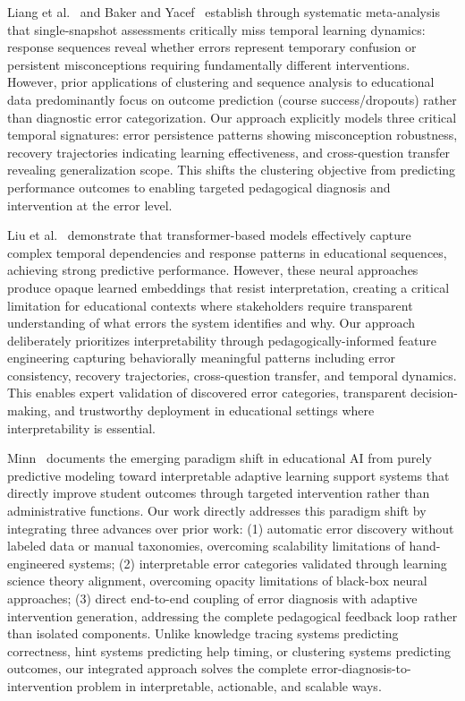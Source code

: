 \documentclass[conference]{IEEEtran}
\begin{document}
Liang et al.~\cite{liang2022} and Baker and Yacef~\cite{baker2009} establish through systematic meta-analysis that single-snapshot assessments critically miss temporal learning dynamics: response sequences reveal whether errors represent temporary confusion or persistent misconceptions requiring fundamentally different interventions. However, prior applications of clustering and sequence analysis to educational data predominantly focus on outcome prediction (course success/dropouts) rather than diagnostic error categorization. Our approach explicitly models three critical temporal signatures: error persistence patterns showing misconception robustness, recovery trajectories indicating learning effectiveness, and cross-question transfer revealing generalization scope. This shifts the clustering objective from predicting performance outcomes to enabling targeted pedagogical diagnosis and intervention at the error level.

Liu et al.~\cite{liu2023} demonstrate that transformer-based models effectively capture complex temporal dependencies and response patterns in educational sequences, achieving strong predictive performance. However, these neural approaches produce opaque learned embeddings that resist interpretation, creating a critical limitation for educational contexts where stakeholders require transparent understanding of what errors the system identifies and why. Our approach deliberately prioritizes interpretability through pedagogically-informed feature engineering capturing behaviorally meaningful patterns including error consistency, recovery trajectories, cross-question transfer, and temporal dynamics. This enables expert validation of discovered error categories, transparent decision-making, and trustworthy deployment in educational settings where interpretability is essential.

Minn~\cite{minn2021} documents the emerging paradigm shift in educational AI from purely predictive modeling toward interpretable adaptive learning support systems that directly improve student outcomes through targeted intervention rather than administrative functions. Our work directly addresses this paradigm shift by integrating three advances over prior work: (1) automatic error discovery without labeled data or manual taxonomies, overcoming scalability limitations of hand-engineered systems; (2) interpretable error categories validated through learning science theory alignment, overcoming opacity limitations of black-box neural approaches; (3) direct end-to-end coupling of error diagnosis with adaptive intervention generation, addressing the complete pedagogical feedback loop rather than isolated components. Unlike knowledge tracing systems predicting correctness, hint systems predicting help timing, or clustering systems predicting outcomes, our integrated approach solves the complete error-diagnosis-to-intervention problem in interpretable, actionable, and scalable ways.
\end{document}
